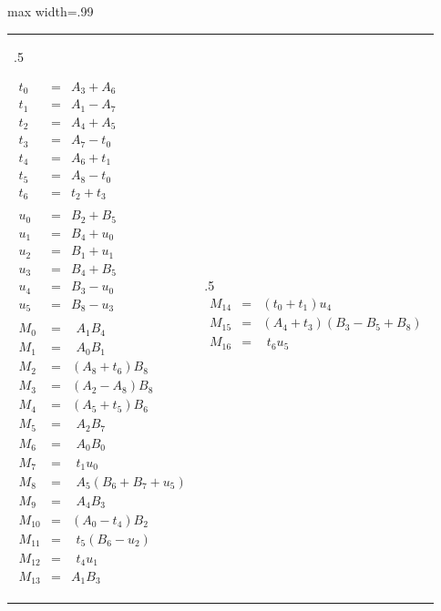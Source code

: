 \documentclass{article}
\begin{document}
\begin{table}[ht!]
    \centering
\begin{adjustbox}{max width=.99\textwidth}
\begin{tabularx}{\textwidth}{>{\hsize.5\hsize\raggedright\arraybackslash}X>{\hsize.5\hsize}X}
\small
\begin{eqnarray*}
t_{0} &=& A_{3}+A_{6}\\
t_{1} &=& A_{1}-A_{7}\\
t_{2} &=& A_{4}+A_{5}\\
t_{3} &=& A_{7}-t_{0}\\
t_{4} &=& A_{6}+t_{1}\\
t_{5} &=& A_{8}-t_{0}\\
t_{6} &=& t_{2}+t_{3}\\
~\\
u_{0} &=& B_{2}+B_{5}\\
u_{1} &=& B_{4}+u_{0}\\
u_{2} &=& B_{1}+u_{1}\\
u_{3} &=& B_{4}+B_{5}\\
u_{4} &=& B_{3}-u_{0}\\
u_{5} &=& B_{8}-u_{3}\\
~\\
M_{0} &=& \phantom{(}A_{1}B_{4}\\
M_{1} &=& \phantom{(}A_{0}B_{1}\\
M_{2} &=& (A_{8}+t_{6})B_{8}\\
M_{3} &=& (A_{2}-A_{8})B_{8}\\
M_{4} &=& (A_{5}+t_{5})B_{6}\\
M_{5} &=& \phantom{(}A_{2}B_{7}\\
M_{6} &=& \phantom{(}A_{0}B_{0}\\
M_{7} &=& \phantom{(}t_{1}u_{0}\\
M_{8} &=& \phantom{(}A_{5}(B_{6}+B_{7}+u_{5})\\
M_{9} &=& \phantom{(}A_{4}B_{3}\\
M_{10} &=& (A_{0}-t_{4})B_{2}\\
M_{11} &=& \phantom{(}t_{5}(B_{6}-u_{2})\\
M_{12} &=& \phantom{(}t_{4}u_{1}\\
M_{13} &=& A_{1}B_{3}
\end{eqnarray*}
&
\small
\begin{eqnarray*}
M_{14} &=& (t_{0}+t_{1})u_{4}\\
M_{15} &=& (A_{4}+t_{3})(B_{3}-B_{5}+B_{8})\\
M_{16} &=& \phantom{(}t_{6}u_{5}\\

\end{eqnarray*}
\end{tabularx}
\end{adjustbox}
\end{table}
\end{document}
